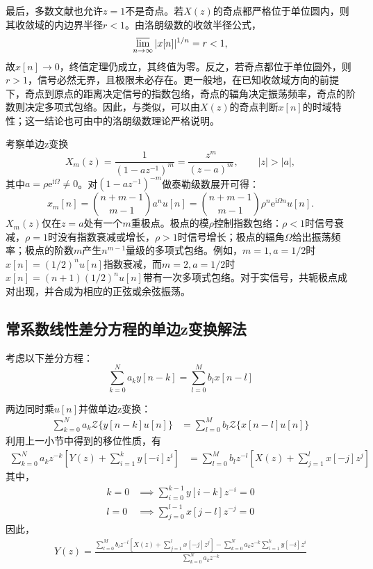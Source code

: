 最后，多数文献也允许$z=1$不是奇点。若$X(z)$的奇点都严格位于单位圆内，则其收敛域的内边界半径$r<1$。由洛朗级数的收敛半径公式，
\[\varlimsup_{n\to\infty}|x[n]|^{1/n}=r<1,\]
故$x[n]\to 0$，终值定理仍成立，其终值为零。反之，若奇点都位于单位圆外，则$r>1$，信号必然无界，且极限未必存在。更一般地，在已知收敛域方向的前提下，奇点到原点的距离决定信号的指数包络，奇点的辐角决定振荡频率，奇点的阶数则决定多项式包络。因此，与类似，可以由$X(z)$的奇点判断$x[n]$的时域特性；这一结论也可由中的洛朗级数理论严格说明。

\begin{example}
    考察单边z变换
    \[X_m(z)=\frac{1}{(1-az^{-1})^m}=\frac{z^m}{(z-a)^m},\qquad |z|>|a|,\]
    其中$a=\rho\mathrm{e}^{\mathrm{i}\Omega}\neq 0$。对$(1-az^{-1})^{-m}$做泰勒级数展开可得：
    \[x_m[n]=\binom{n+m-1}{m-1}a^n u[n]
    =\binom{n+m-1}{m-1}\rho^n\mathrm{e}^{\mathrm{i}\Omega n}u[n].\]
    $X_m(z)$仅在$z=a$处有一个$m$重极点。极点的模$\rho$控制指数包络：$\rho<1$时信号衰减，$\rho=1$时没有指数衰减或增长，$\rho>1$时信号增长；极点的辐角$\Omega$给出振荡频率；极点的阶数$m$产生$n^{m-1}$量级的多项式包络。例如，$m=1,a=1/2$时$x[n]=(1/2)^n u[n]$指数衰减，而$m=2,a=1/2$时$x[n]=(n+1)(1/2)^n u[n]$带有一次多项式包络。对于实信号，共轭极点成对出现，并合成为相应的正弦或余弦振荡。
\end{example}

\subsection{常系数线性差分方程的单边z变换解法}\label{sub:z_difference_equation}

考虑以下差分方程：
$$\sum_{k=0}^{N}a_k y[n-k] = \sum_{l=0}^{M}b_l x[n-l]$$


两边同时乘$u[n]$并做单边z变换：
\begin{align*}
    \sum_{k=0}^{N}a_k \mathcal{Z}\{y[n-k]u[n]\}&=\sum_{l=0}^{M}b_l \mathcal{Z}\{x[n-l]u[n]\}
\end{align*}
利用上一小节中得到的移位性质，有\begin{align*}
    \sum_{k=0}^{N}a_k z^{-k}\left[Y(z)+\sum_{i=1}^{k}y[-i]z^{i}\right]&=\sum_{l=0}^{M}b_l z^{-l}\left[X(z)+\sum_{j=1}^{l}x[-j]z^{j}\right]
\end{align*}
其中，\begin{align*}
    k=0&\implies \sum_{i=0}^{k-1}y[i-k]z^{-i}=0\\
    l=0&\implies \sum_{j=0}^{l-1}x[j-l]z^{-j}=0
\end{align*}
因此，\begin{align*}
    Y(z)=\frac{\sum_{l=0}^{M}b_l z^{-l}\left[X(z)+\sum_{j=1}^{l}x[-j]z^{j}\right]-\sum_{k=0}^{N}a_k z^{-k}\sum_{i=1}^{k}y[-i]z^{i}}{\sum_{k=0}^{N}a_k z^{-k}}
\end{align*}

